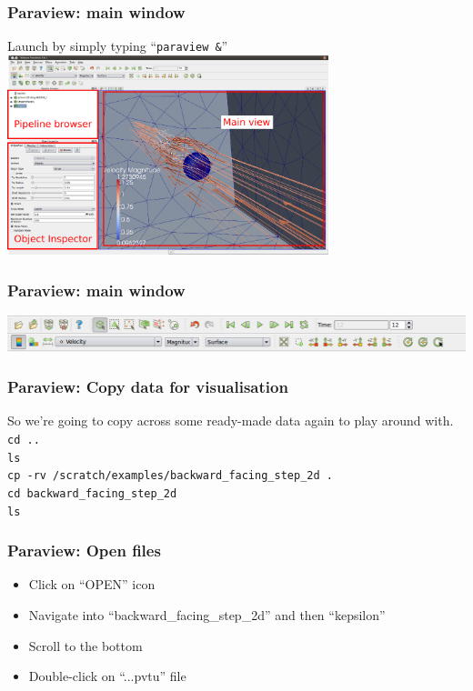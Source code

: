 \documentclass[12pt]{beamer}
\begin{document}
\begin{frame}
    \frametitle{Paraview: main window}
\begin{center}
Launch by simply typing ``{\tt paraview \&}''\\
\vspace{5mm}
\includegraphics[width=0.7\textwidth]{images/paraview_window.png}
\end{center}
\end{frame}
\begin{frame}
    \frametitle{Paraview: main window}
\begin{center}
\includegraphics[width=\textwidth]{images/paraview_toolbar.png}
\end{center}
\end{frame}
\begin{frame}
    \frametitle{Paraview: Copy data for visualisation}
So we're going to copy across some ready-made data again
to play around with.\\
\vspace{5mm}
{\tt cd ..} \\
{\tt ls} \\
{\tt cp -rv /scratch/examples/backward\_facing\_step\_2d .}\\
{\tt cd backward\_facing\_step\_2d}\\
{\tt ls}

\end{frame}
\begin{frame}
    \frametitle{Paraview: Open files}
\begin{center}
\begin{itemize}
\item Click on ``OPEN'' icon
\item Navigate into ``backward\_facing\_step\_2d'' and then ``kepsilon''
\item Scroll to the bottom
\item Double-click on ``...pvtu'' file
\end{itemize}
\end{center}
\end{frame}
\end{document}
